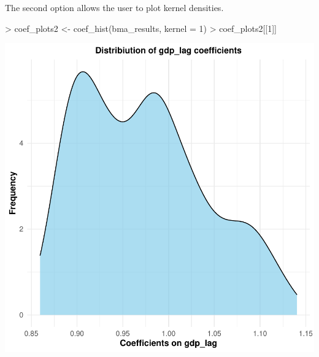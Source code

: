 \documentclass[a4paper]{article}
\begin{document}
The second option allows the user to plot kernel densities.
\begin{Schunk}
\begin{Sinput}
> coef_plots2 <- coef_hist(bma_results, kernel = 1)
> coef_plots2[[1]]
\end{Sinput}
\end{Schunk}
\includegraphics{bdsm_vignette-024}
\end{document}

